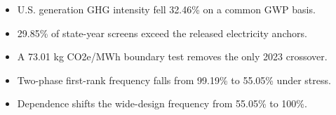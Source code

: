 \begin{itemize}
\item U.S. generation GHG intensity fell 32.46\% on a common GWP basis.
\item 29.85\% of state-year screens exceed the released electricity anchors.
\item A 73.01 kg CO2e/MWh boundary test removes the only 2023 crossover.
\item Two-phase first-rank frequency falls from 99.19\% to 55.05\% under stress.
\item Dependence shifts the wide-design frequency from 55.05\% to 100\%.
\end{itemize}
